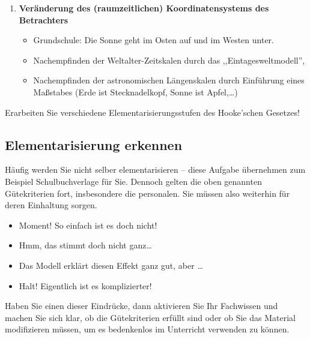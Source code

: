\begin{enumerate}
	\item \textbf{Ver\"{a}nderung des (raumzeitlichen) Koordinatensystems des
	Betrachters}
	\begin{beisp}
	\begin{itemize}
		\item Grundschule: Die Sonne geht im Osten auf und im Westen unter.
		\item Nachempfinden der Weltalter-Zeitskalen durch das ,,Eintagesweltmodell'',
		\item Nachempfinden der astronomischen L\"{a}ngenskalen durch Einf\"{u}hrung eines
		Ma{\ss}stabes (Erde ist Stecknadelkopf, Sonne ist Apfel,\dots)
	\end{itemize}
	\end{beisp}
	
\end{enumerate}

\begin{uea}
	Erarbeiten Sie verschiedene Elementarisierungsstufen des Hooke'schen Gesetzes!
\end{uea}

\subsection{Elementarisierung erkennen}
Häufig werden Sie nicht selber elementarisieren -- diese Aufgabe übernehmen zum Beispiel Schulbuchverlage für Sie. Dennoch gelten die oben genannten Gütekriterien fort, insbesondere die personalen. Sie müssen also weiterhin für deren Einhaltung sorgen. \begin{itemize}
	\item Moment! So einfach ist es doch nicht!
	\item Hmm, das stimmt doch nicht ganz\dots
	\item Das Modell erklärt diesen Effekt ganz gut, aber \dots
	\item Halt! Eigentlich ist es komplizierter!
\end{itemize}
Haben Sie einen dieser Eindrücke, dann aktivieren Sie Ihr Fachwissen und machen Sie sich klar, ob die Gütekriterien erfüllt sind oder ob Sie das Material modifizieren müssen, um es bedenkenlos im Unterricht verwenden zu können.

